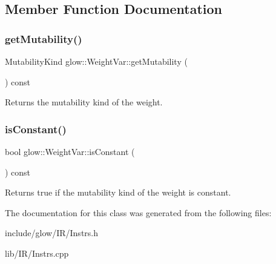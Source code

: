 \subsection{Member Function Documentation}
\mbox{\label{classglow_1_1_weight_var_a1041b9e284dc6297d660d41d426da66e}} 
\subsubsection{\texorpdfstring{get\+Mutability()}{getMutability()}}
{\footnotesize\ttfamily Mutability\+Kind glow\+::\+Weight\+Var\+::get\+Mutability (\begin{DoxyParamCaption}{ }\end{DoxyParamCaption}) const\hspace{0.3cm}{\ttfamily [inline]}}

\begin{DoxyReturn}{Returns}
the mutability kind of the weight. 
\end{DoxyReturn}
\mbox{\label{classglow_1_1_weight_var_a7b6e1db89415271742303e738217e858}} 
\subsubsection{\texorpdfstring{is\+Constant()}{isConstant()}}
{\footnotesize\ttfamily bool glow\+::\+Weight\+Var\+::is\+Constant (\begin{DoxyParamCaption}{ }\end{DoxyParamCaption}) const\hspace{0.3cm}{\ttfamily [inline]}}

\begin{DoxyReturn}{Returns}
true if the mutability kind of the weight is constant. 
\end{DoxyReturn}


The documentation for this class was generated from the following files\+:\begin{DoxyCompactItemize}
\item 
include/glow/\+I\+R/Instrs.\+h\item 
lib/\+I\+R/Instrs.\+cpp\end{DoxyCompactItemize}
